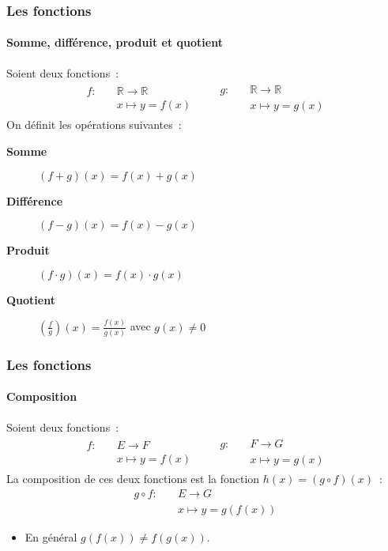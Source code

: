\documentclass[10pt,notheorems]{beamer}
\theoremstyle{plain}
\theoremstyle{definition} %
\begin{document}
\begin{frame}
  \frametitle{Les fonctions}
  \framesubtitle{Somme, différence, produit et quotient}
  \hypertarget{slide_fonctions_opérations}{}

  Soient deux fonctions~:
  \begin{eqnarray*}
    \begin{split}
      f: \quad &\mathbb R \longrightarrow \mathbb R\\
      &x \longmapsto y = f(x)
    \end{split}
      &
        \quad \begin{split}
          g: \quad &\mathbb R \longrightarrow \mathbb R\\
          &x \longmapsto y = g(x)
        \end{split}
  \end{eqnarray*}
  \bigskip
  On définit les opérations suivantes~:
  \begin{description}
  \item[\textbf{Somme}] $(f+g)(x) = f(x)+g(x)$\newline
  \item[\textbf{Différence}] $(f-g)(x) = f(x)-g(x)$\newline
  \item[\textbf{Produit}] $(f \cdot g)(x) = f(x) \cdot g(x)$\newline
  \item[\textbf{Quotient}] $\left(\frac{f}{g}\right)(x) = \frac{f(x)}{g(x)}$ avec $g(x)\neq 0$\newline
  \end{description}

\end{frame}


\begin{frame}
  \frametitle{Les fonctions}
  \framesubtitle{Composition}
  \hypertarget{slide_fonctions_composition}{}

  Soient deux fonctions~:
  \begin{eqnarray*}
    \begin{split}
      f: \quad & E \longrightarrow F\\
      &x \longmapsto y = f(x)
    \end{split}
      &
        \quad \begin{split}
          g: \quad & F \longrightarrow G\\
          &x \longmapsto y = g(x)
        \end{split}
  \end{eqnarray*}
  \bigskip
  La composition de ces deux fonctions est la fonction $h(x) = (g \circ f)(x)$~:
  \[
    \begin{split}
      g \circ f: \quad & E \longrightarrow G\\
      &x \longmapsto y = g(f(x))
    \end{split}
  \]

  \bigskip

  \begin{itemize}
  \item[\dbend] En général $g(f(x))\neq f(g(x))$.
  \end{itemize}

\end{frame}
\end{document}
